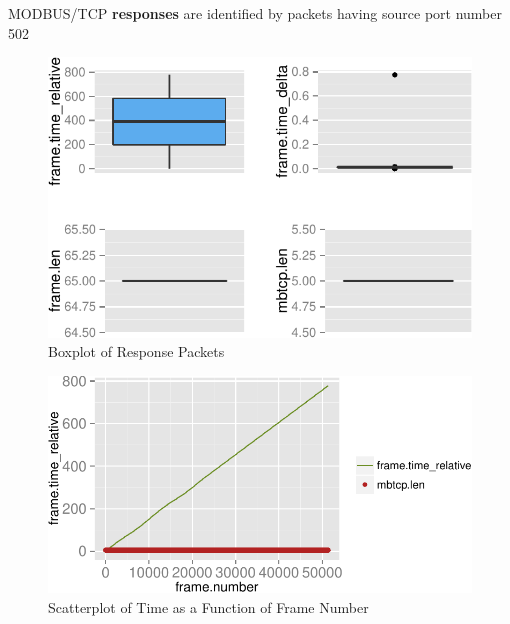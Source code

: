 \documentclass[12pt,]{article}
\begin{document}
MODBUS/TCP \textbf{responses} are identified by packets having source
port number 502

\begin{figure}

{\centering \includegraphics{thesis_files/figure-latex/unnamed-chunk-26-1} 

}

\caption{Boxplot of Response Packets}\label{fig:unnamed-chunk-26}
\end{figure}

\begin{figure}

{\centering \includegraphics{thesis_files/figure-latex/unnamed-chunk-27-1} 

}

\caption{Scatterplot of Time as a Function of Frame Number}\label{fig:unnamed-chunk-27}
\end{figure}
\end{document}

